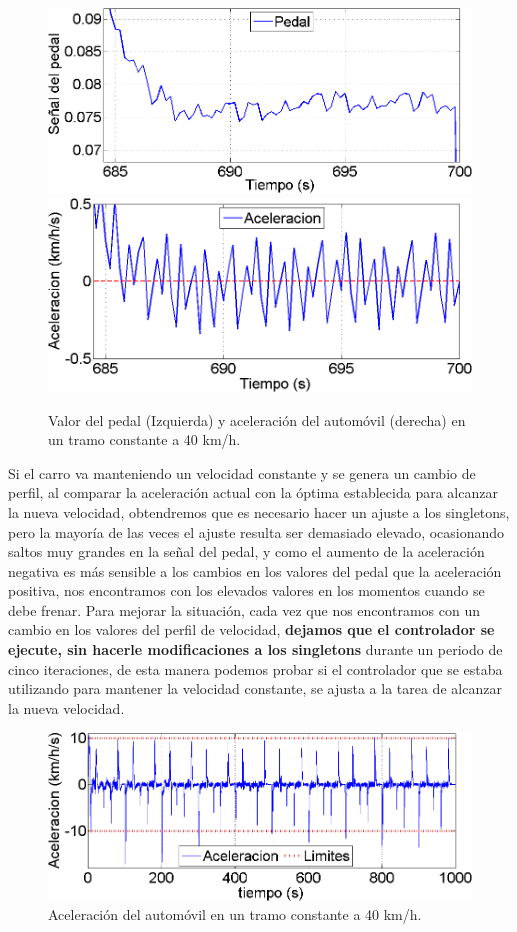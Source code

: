 \begin{figure}[h]
\centering
\includegraphics[width=0.5\linewidth,type=png,ext=.png,read=.png]{figures/pedalCtte}\includegraphics[width=0.5\linewidth,type=png,ext=.png,read=.png]{figures/aceCtte}
\caption{Valor del pedal (Izquierda) y aceleración del automóvil (derecha) en un tramo constante a 40 km/h.}
\label{fig:aceCtte}
\end{figure} 

Si el carro va manteniendo un velocidad constante y se genera un cambio de perfil, al comparar la aceleración actual con la óptima establecida para alcanzar la nueva velocidad, obtendremos que es necesario hacer un ajuste a los singletons, pero la mayoría de las veces el ajuste resulta ser demasiado elevado, ocasionando saltos muy grandes en la señal del pedal, y como el aumento de la aceleración negativa es más sensible a los cambios en los valores del pedal que la aceleración positiva, nos encontramos con los elevados valores en los momentos cuando se debe frenar. Para mejorar la situación, cada vez que nos encontramos con un cambio en los valores del perfil de velocidad, \textbf{dejamos que el controlador se ejecute, sin hacerle modificaciones a los singletons} durante un periodo de cinco iteraciones, de esta manera podemos probar si el controlador que se estaba utilizando para mantener la velocidad constante, se ajusta a la tarea de alcanzar la nueva velocidad.

\begin{figure}[h]
\centering
\includegraphics[width=0.6\linewidth,type=png,ext=.png,read=.png]{figures/acelFinal}
\caption{Aceleración del automóvil en un tramo constante a 40 km/h.}
\label{fig:acelFinal}
\end{figure}

